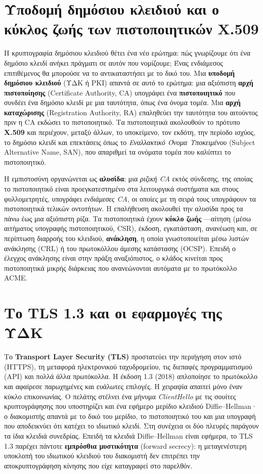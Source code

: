 \section{Υποδομή δημόσιου κλειδιού και ο κύκλος ζωής των πιστοποιητικών X.509}\label{sec:7.4}
Η κρυπτογραφία δημόσιου κλειδιού θέτει ένα νέο ερώτημα: πώς γνωρίζουμε ότι ένα δημόσιο κλειδί ανήκει πράγματι σε αυτόν που νομίζουμε; Ένας ενδιάμεσος επιτιθέμενος θα μπορούσε να το αντικαταστήσει με το δικό του. Μια \textbf{υποδομή δημόσιου κλειδιού} (ΥΔΚ ή PKI) απαντά σε αυτό το ερώτημα: μια αξιόπιστη \textbf{αρχή πιστοποίησης} (Certificate Authority, CA) υπογράφει ένα \textbf{πιστοποιητικό} που συνδέει ένα δημόσιο κλειδί με μια ταυτότητα, όπως ένα όνομα τομέα. Μια \textbf{αρχή καταχώρισης} (Registration Authority, RA) επαληθεύει την ταυτότητα του αιτούντος πριν η CA εκδώσει το πιστοποιητικό. Τα πιστοποιητικά ακολουθούν το πρότυπο \textbf{X.509} και περιέχουν, μεταξύ άλλων, το υποκείμενο, τον εκδότη, την περίοδο ισχύος, το δημόσιο κλειδί και επεκτάσεις όπως το \emph{Εναλλακτικό Όνομα Υποκειμένου} (Subject Alternative Name, SAN), που απαριθμεί τα ονόματα τομέα που καλύπτει το πιστοποιητικό.

Η εμπιστοσύνη οργανώνεται ως \textbf{αλυσίδα}: μια \emph{ριζική CA} εκτός σύνδεσης, της οποίας το πιστοποιητικό είναι προεγκατεστημένο στα λειτουργικά συστήματα και στους φυλλομετρητές, υπογράφει \emph{ενδιάμεσες CA}, οι οποίες με τη σειρά τους υπογράφουν τα πιστοποιητικά τελικών οντοτήτων. Η επαλήθευση ακολουθεί την αλυσίδα προς τα πάνω έως μια αξιόπιστη ρίζα. Τα πιστοποιητικά έχουν \textbf{κύκλο ζωής} —αίτηση (μέσω αιτήματος υπογραφής πιστοποιητικού, CSR), έκδοση, εγκατάσταση, ανανέωση και, σε περίπτωση διαρροής του κλειδιού, \textbf{ανάκληση}, η οποία γνωστοποιείται μέσω λιστών ανάκλησης (CRL) ή του πρωτοκόλλου άμεσης κατάστασης (OCSP). Επειδή ο έλεγχος ανάκλησης είναι στην πράξη αναξιόπιστος, ο κλάδος κινείται προς πιστοποιητικά μικρής διάρκειας που ανανεώνονται αυτόματα με το πρωτόκολλο ACME.

\section{Το TLS 1.3 και οι εφαρμογές της ΥΔΚ}\label{sec:7.5}
Το \textbf{Transport Layer Security (TLS)} προστατεύει την περιήγηση στον ιστό (HTTPS), τη μεταφορά ηλεκτρονικού ταχυδρομείου, τις διεπαφές προγραμματισμού (API) και πολλά άλλα πρωτόκολλα. Η έκδοση 1.3 (2018) απλοποίησε το πρωτόκολλο και αφαίρεσε παρωχημένες και ευάλωτες επιλογές. Η χειραψία απαιτεί μόνο έναν κύκλο επικοινωνίας. Ο πελάτης στέλνει ένα μήνυμα \emph{ClientHello} με τις σουίτες κρυπτογράφησης που υποστηρίζει και ένα εφήμερο μερίδιο κλειδιού Diffie–Hellman· ο διακομιστής απαντά με το δικό του μερίδιο, το πιστοποιητικό του και μια υπογραφή που αποδεικνύει ότι κατέχει το ιδιωτικό κλειδί. Στη συνέχεια οι δύο πλευρές παράγουν τα ίδια κλειδιά συνεδρίας. Επειδή τα κλειδιά Diffie–Hellman είναι εφήμερα, το TLS 1.3 παρέχει πάντοτε \textbf{εμπρόσθια μυστικότητα} (forward secrecy): η μεταγενέστερη υποκλοπή του ιδιωτικού κλειδιού του διακομιστή δεν επιτρέπει την αποκρυπτογράφηση κίνησης που είχε καταγραφεί στο παρελθόν.

